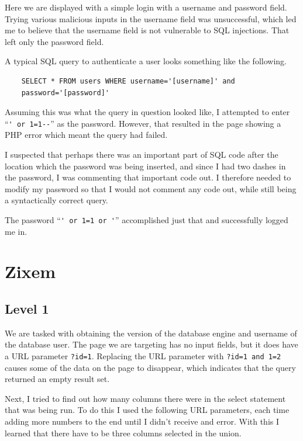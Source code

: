 \documentclass{article}
\begin{document}
Here we are displayed with a simple login with a username and password field. Trying various malicious inputs in the username field was unsuccessful, which led me to believe that the username field is not vulnerable to SQL injections. That left only the password field.

A typical SQL query to authenticate a user looks something like the following.

\begin{verbatim}
	SELECT * FROM users WHERE username='[username]' and
	password='[password]'
\end{verbatim}

Assuming this was what the query in question looked like, I attempted to enter ``\verb`' or 1=1--`'' as the password. However, that resulted in the page showing a PHP error which meant the query had failed.

I suspected that perhaps there was an important part of SQL code after the location which the password was being inserted, and since I had two dashes in the password, I was commenting that important code out. I therefore needed to modify my password so that I would not comment any code out, while still being a syntactically correct query.

The password ``\verb`' or 1=1 or '`'' accomplished just that and successfully logged me in.

\section{Zixem}

\subsection{Level 1}

We are tasked with obtaining the version of the database engine and username of the database user. The page we are targeting has no input fields, but it does have a URL parameter \verb`?id=1`. Replacing the URL parameter with \verb`?id=1 and 1=2` causes some of the data on the page to disappear, which indicates that the query returned an empty result set.

Next, I tried to find out how many columns there were in the select statement that was being run. To do this I used the following URL parameters, each time adding more numbers to the end until I didn't receive and error. With this I learned that there have to be three columns selected in the union.
\end{document}
